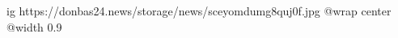  
 
 
 
 

\ifcmt
  ig https://donbas24.news/storage/news/sceyomdumg8quj0f.jpg
  @wrap center
  @width 0.9
\fi

